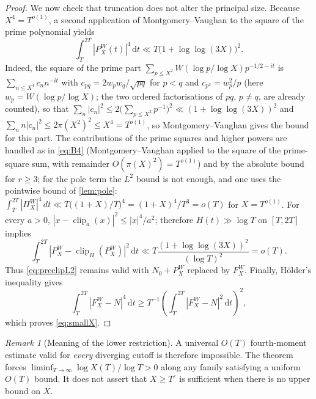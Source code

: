 \documentclass[11pt,a4paper]{article}
\numberwithin{equation}{section}
\theoremstyle{definition}
\theoremstyle{remark}
\newtheorem{remark}[theorem]{Remark}
\newcommand{\clip}{\operatorname{clip}}
\newcommand{\dd}{\,\mathrm dt}
\begin{document}
\begin{proof}
We now check that truncation does not alter the principal size. Because $X^4=T^{o(1)}$, a second application of Montgomery--Vaughan to the square of the prime polynomial yields
\begin{equation}\label{eq:powerfour}
\int_T^{2T}|P_X^W(t)|^4\dd\ll T\bigl(1+\log\log(3X)\bigr)^2.
\end{equation}
Indeed, the square of the prime part $\sum_{p\le X^2}W(\log p/\log X)p^{-1/2-it}$ is $\sum_{n\le X^4}c_nn^{-it}$ with $c_{pq}=2w_pw_q/\sqrt{pq}$ for $p<q$ and $c_{p^2}=w_p^2/p$ (here $w_p=W(\log p/\log X)$; the two ordered factorisations of $pq$, $p\ne q$, are already counted), so that $\sum_n|c_n|^2\le2\bigl(\sum_{p\le X^2}p^{-1}\bigr)^2\ll(1+\log\log(3X))^2$ and $\sum_nn|c_n|^2\le2\pi(X^2)^2\le X^4=T^{o(1)}$, so Montgomery--Vaughan gives the bound for this part. The contributions of the prime squares and higher powers are handled as in \eqref{eq:B4} (Montgomery--Vaughan applied to the square of the prime-square sum, with remainder $O(\pi(X)^2)=T^{o(1)}$) and by the absolute bound for $r\ge3$; for the pole term the $L^2$ bound is not enough, and one uses the pointwise bound of \cref{lem:pole}: $\int_T^{2T}|\Pi_X^W|^4\,dt\ll T\bigl((1+X)/T\bigr)^4=(1+X)^4/T^3=o(T)$ for $X=T^{o(1)}$. For every $a>0$, $|x-\clip_a(x)|^2\le |x|^4/a^2$; therefore $H(t)\gg\log T$ on $[T,2T]$ implies
\begin{equation}
\int_T^{2T}|P_X^W-\clip_H(P_X^W)|^2\dd
\ll T\frac{(1+\log\log(3X))^2}{(\log T)^2}=o(T).
\end{equation}
Thus \eqref{eq:preclipL2} remains valid with $N_0+P_X^W$ replaced by $F_X^W$. Finally, H\"older's inequality gives
\begin{equation}
\int_T^{2T}|F_X^W-N|^4\dd
\ge T^{-1}\left(\int_T^{2T}|F_X^W-N|^2\dd\right)^2,
\end{equation}
which proves \eqref{eq:smallX}.
\end{proof}

\begin{remark}[Meaning of the lower restriction]\label{rem:necessary}
A universal $O(T)$ fourth-moment estimate valid for \emph{every} diverging cutoff is therefore impossible. The theorem forces $\liminf_{T\to\infty}\log X(T)/\log T>0$ along any family satisfying a uniform $O(T)$ bound. It does not assert that $X\ge T^\varepsilon$ is sufficient when there is no upper bound on $X$.
\end{remark}
\end{document}
